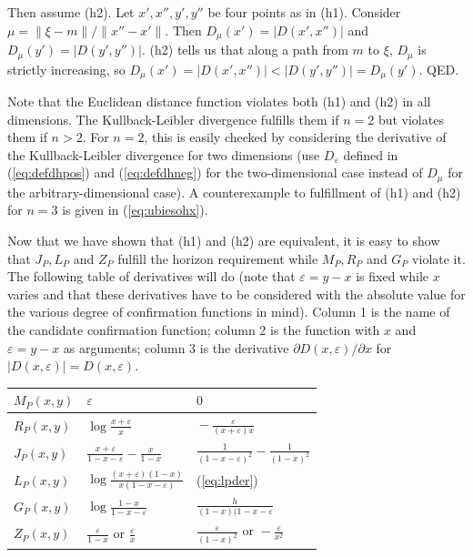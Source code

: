 \documentclass[phd,12pt,oneside]{ubcthesis}
\begin{document}
Then assume (h2). Let $x',x'',y',y''$ be four points as in (h1).
Consider $\mu=\|\xi-m\|/\|x''-x'\|$. Then $D_{\mu}(x')=|D(x',x'')|$
and $D_{\mu}(y')=|D(y',y'')|$. (h2) tells us that along a path from
$m$ to $\xi$, $D_{\mu}$ is strictly increasing, so
$D_{\mu}(x')=|D(x',x'')|<|D(y',y'')|=D_{\mu}(y')$. QED.

Note that the Euclidean distance function violates both (h1) and (h2)
in all dimensions. The Kullback-Leibler divergence fulfills them if
$n=2$ but violates them if $n>2$. For $n=2$, this is easily checked by
considering the derivative of the Kullback-Leibler divergence for two
dimensions (use $D_{\varepsilon}$ defined in (\ref{eq:defdhpos}) and
(\ref{eq:defdhneg}) for the two-dimensional case instead of $D_{\mu}$
for the arbitrary-dimensional case). A counterexample to fulfillment
of (h1) and (h2) for $n=3$ is given in (\ref{eq:ubiesohx}).

Now that we have shown that (h1) and (h2) are equivalent, it is easy
to show that $J_{P},L_{P}$ and $Z_{P}$ fulfill the horizon requirement
while $M_{P},R_{P}$ and $G_{P}$ violate it. The following table of
derivatives will do (note that $\varepsilon=y-x$ is fixed while $x$
varies and that these derivatives have to be considered with the
absolute value for the various degree of confirmation functions in
mind). Column 1 is the name of the candidate confirmation function;
column 2 is the function with $x$ and $\varepsilon=y-x$ as arguments;
column 3 is the derivative $\partial{}D(x,\varepsilon)/\partial{}x$
for $|D(x,\varepsilon)|=D(x,\varepsilon)$.

\begin{tabular}{|l|l|l|}\hline
  $M_{P}(x,y)$ & $\displaystyle{}\varepsilon$ & $0$ \\ \hline
  $R_{P}(x,y)$ & $\displaystyle{}\log\frac{x+\varepsilon}{x}$ & $\displaystyle{}-\frac{\varepsilon}{(x+\varepsilon)x}$ \\ \hline
  $J_{P}(x,y)$ & $\displaystyle{}\frac{x+\varepsilon}{1-x-\varepsilon}-\frac{x}{1-x}$ & $\displaystyle{}\frac{1}{(1-x-\varepsilon)^{2}}-\frac{1}{(1-x)^{2}}$ \\ \hline
  $L_{P}(x,y)$ & $\displaystyle{}\log\frac{(x+\varepsilon)(1-x)}{x(1-x-\varepsilon)}$ & (\ref{eq:lpder}) \\ \hline
  $G_{P}(x,y)$ & $\displaystyle{}\log\frac{1-x}{1-x-\varepsilon}$ & $\displaystyle{}\frac{h}{(1-x)(1-x-\varepsilon}$ \\ \hline
  $Z_{P}(x,y)$ & $\displaystyle{}\frac{\varepsilon}{1-x}\mbox{ or }\frac{\varepsilon}{x}$ & $\displaystyle{}\frac{\varepsilon}{(1-x)^{2}}\mbox{ or }-\frac{\varepsilon}{x^{2}}$ \\ \hline
\end{tabular}
\end{document}
